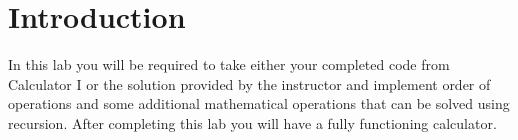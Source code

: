 \section{Introduction}

In this lab you will be required to take either your completed code from Calculator I or the solution provided by the instructor and implement order of operations and some additional mathematical operations that can be solved using recursion.  After completing this lab you will have a fully functioning calculator.